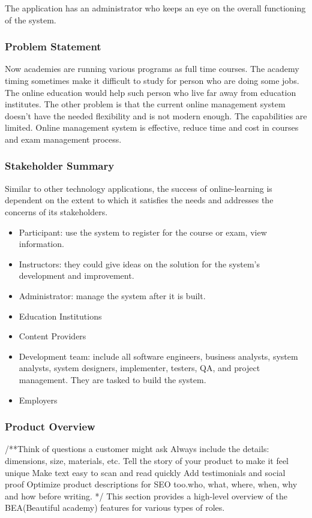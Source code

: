 \documentclass{scrartcl}
\begin{document}
The application has an administrator who keeps an eye on the overall functioning of the system.

  	
  	\subsubsection{Problem Statement}
  	Now academies are running various programs as full time courses. The academy timing sometimes make it difficult to study for person who are doing some jobs. The online education would help such person who live far away from education institutes.
The other problem is that the current online management system doesn't have the needed flexibility and is not modern enough. The capabilities are limited.
Online management system is effective, reduce time and cost in courses and exam management process.

  	\subsubsection{Stakeholder Summary}
  	Similar to other technology applications, the success of online-learning is dependent on the extent to which it satisfies the needs and addresses the concerns of its stakeholders.
  	\begin{itemize}
  	\item Participant: use the system to register for the course or exam, view 			information.
  	\item Instructors: they could give ideas on the solution for the system’s development and improvement.
  	\item Administrator: manage the system after it is built.
  	\item Education Institutions 
  	\item Content Providers
  	\item Development team: include all software engineers, business analysts, system analysts, system designers, implementer, testers, QA, and project management. They are tasked to build the system.
  	\item Employers
  	\end{itemize}
  	
  	
  	\subsubsection{Product Overview}
  	/**Think of questions a customer might ask
Always include the details: dimensions, size, materials, etc.
Tell the story of your product to make it feel unique
Make text easy to scan and read quickly
Add testimonials and social proof
Optimize product descriptions for SEO too.who, what, where, when, why and how before writing. */
  	This  section provides a high-level overview of the BEA(Beautiful academy) features for various types of roles.
  	 
\end{document}

